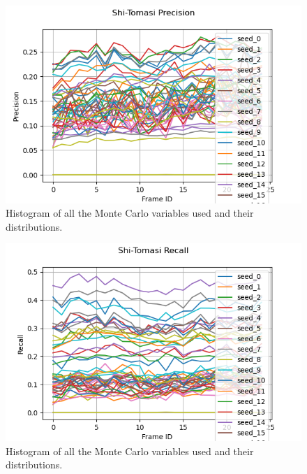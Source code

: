 \documentclass[11pt, conference, letterpaper]{IEEEtran}
\begin{document}
\begin{figure}[h]
    \centering
    \includegraphics[width=\linewidth]{mc_images/mc_stc_precision.png}
    \caption{Histogram of all the Monte Carlo variables used and their distributions.}
    \label{fig:mc_stc_prec}
\end{figure}

\begin{figure}[h]
    \centering
    \includegraphics[width=\linewidth]{mc_images/mc_stc_recall.png}
    \caption{Histogram of all the Monte Carlo variables used and their distributions.}
    \label{fig:mc_stc_rec}
\end{figure}
\end{document}
